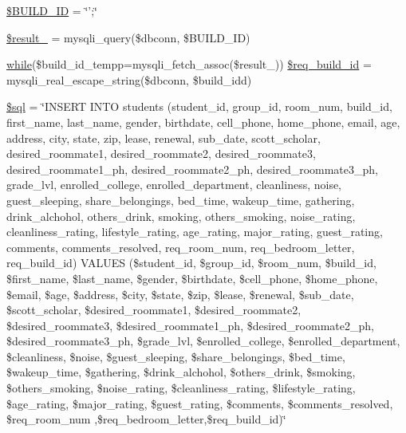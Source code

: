 \begin{DoxyCompactItemize}
\item 
\hyperlink{admin__view_2validate_2studentVal_8php_a4003cf8da4c94911cef7e69853cbac42}{\$\-B\-U\-I\-L\-D\-\_\-\-I\-D} = \char`\"{}';\char`\"{}
\item 
\hyperlink{admin__view_2validate_2studentVal_8php_a0b3f63d6f969a6ad92963ceae90afab9}{\$result\-\_} = mysqli\-\_\-query(\$dbconn, \$\-B\-U\-I\-L\-D\-\_\-\-I\-D)
\item 
\hyperlink{studentForm_8php_abeb5d2366a9870820ffb1e260d040d8d}{while}(\$build\-\_\-id\-\_\-tempp=mysqli\-\_\-fetch\-\_\-assoc(\$result\-\_)) \hyperlink{admin__view_2validate_2studentVal_8php_aa7111d653b27e29a80df8d7421848981}{\$req\-\_\-build\-\_\-id} = mysqli\-\_\-real\-\_\-escape\-\_\-string(\$dbconn, \$build\-\_\-idd)
\item 
\hyperlink{admin__view_2validate_2studentVal_8php_a047170d6020a882807665812a27e2525}{\$sql} = \char`\"{}\-I\-N\-S\-E\-R\-T \-I\-N\-T\-O students (student\-\_\-id, group\-\_\-id, room\-\_\-num, build\-\_\-id, first\-\_\-name, last\-\_\-name, gender, birthdate, cell\-\_\-phone, home\-\_\-phone, email, age, address, city, state, zip, lease, renewal, sub\-\_\-date, scott\-\_\-scholar, desired\-\_\-roommate1, desired\-\_\-roommate2, desired\-\_\-roommate3, desired\-\_\-roommate1\-\_\-ph, desired\-\_\-roommate2\-\_\-ph, desired\-\_\-roommate3\-\_\-ph, grade\-\_\-lvl, enrolled\-\_\-college, enrolled\-\_\-department, cleanliness, noise, guest\-\_\-sleeping, share\-\_\-belongings, bed\-\_\-time, wakeup\-\_\-time, gathering, drink\-\_\-alchohol, others\-\_\-drink, smoking, others\-\_\-smoking, noise\-\_\-rating, cleanliness\-\_\-rating, lifestyle\-\_\-rating, age\-\_\-rating, major\-\_\-rating, guest\-\_\-rating, comments, comments\-\_\-resolved, req\-\_\-room\-\_\-num, req\-\_\-bedroom\-\_\-letter, req\-\_\-build\-\_\-id) \-V\-A\-L\-U\-E\-S (\$student\-\_\-id, \$group\-\_\-id, \$room\-\_\-num, \$build\-\_\-id, \$first\-\_\-name, \$last\-\_\-name, \$gender, \$birthdate, \$cell\-\_\-phone, \$home\-\_\-phone, \$email, \$age, \$address, \$city, \$state, \$zip, \$lease, \$renewal, \$sub\-\_\-date, \$scott\-\_\-scholar, \$desired\-\_\-roommate1, \$desired\-\_\-roommate2, \$desired\-\_\-roommate3, \$desired\-\_\-roommate1\-\_\-ph, \$desired\-\_\-roommate2\-\_\-ph, \$desired\-\_\-roommate3\-\_\-ph, \$grade\-\_\-lvl, \$enrolled\-\_\-college, \$enrolled\-\_\-department, \$cleanliness, \$noise, \$guest\-\_\-sleeping, \$share\-\_\-belongings, \$bed\-\_\-time, \$wakeup\-\_\-time, \$gathering, \$drink\-\_\-alchohol, \$others\-\_\-drink, \$smoking, \$others\-\_\-smoking, \$noise\-\_\-rating, \$cleanliness\-\_\-rating, \$lifestyle\-\_\-rating, \$age\-\_\-rating, \$major\-\_\-rating, \$guest\-\_\-rating, \$comments, \$comments\-\_\-resolved, \$req\-\_\-room\-\_\-num ,\$req\-\_\-bedroom\-\_\-letter,\$req\-\_\-build\-\_\-id)\char`\"{}
\end{DoxyCompactItemize}



